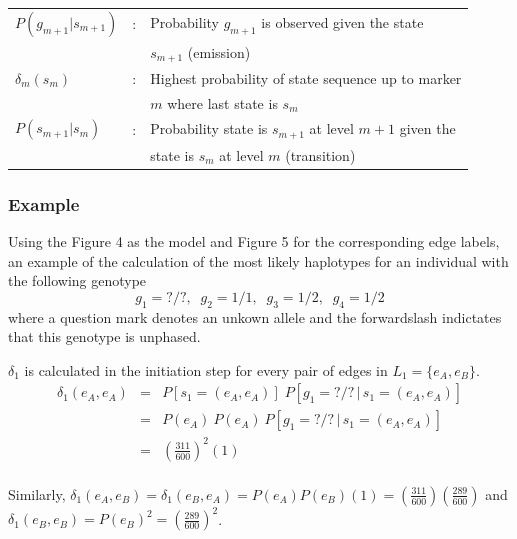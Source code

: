 \documentclass[a4paper,11pt,twoside,abstraction,titlepage]{article}
\begin{document}
\begin{framed}
\begin{tabular}{lll}
\hspace{-20pt} $P(g_{m+1}|s_{m+1})$ &:& \hspace{-5pt} Probability $g_{m+1}$ is observed given the state \\
&& $s_{m+1}$ (emission) \\
\hspace{-20pt}  $\delta_m(s_m)$ &:& \hspace{-5pt} Highest probability of state sequence up to marker \\
&& $m$ where last state is $s_m$\\ 
\hspace{-20pt} $P(s_{m+1}|s_m)$ &:& Probability state is $s_{m+1}$ at level $m+1$ given the \\
&& state is $s_m$ at level $m$ (transition)
\end{tabular}
\end{framed}

\newpage
\subsubsection{Example}
Using the Figure 4 as the model and Figure 5 for the corresponding edge labels, an example of the calculation of the most likely haplotypes for an individual with the following genotype
\begin{equation*}
g_1 = ?/?, \;\; g_2 = 1/1, \;\; g_3 = 1/2, \;\; g_4 = 1/2
\end{equation*}
where a question mark denotes an unkown allele and the forwardslash indictates that this genotype is unphased.
\vspace{8pt}

\noindent $\delta_1$ is calculated in the initiation step for every pair of edges in $L_1 = \{e_{A}, e_{B}\}$.
\begin{eqnarray*}
\delta_1(e_A,e_A) &=& P[s_1 = (e_A, e_A)] \; P[g_1=?/? \, | \, s_1 = (e_A,e_A)] \\
&=& P(e_A) \: P(e_A) \: P[g_1=?/? \, | \, s_1 = (e_A,e_A)] \\
&=& \left(\frac{311}{600}\right)^2\!\!(1)  \\
\end{eqnarray*}
\vspace{-25pt}

\noindent Similarly, $\delta_1(e_A,e_B)  = \delta_1(e_B,e_A)  = P(e_A)P(e_B)(1) = \left(\frac{311}{600}\right)\!\left(\frac{289}{600}\right)$ 
and $\delta_1(e_B,e_B) = P(e_B)^2 = \left(\frac{289}{600}\right)^2$.
\vspace{10pt}
\end{document}
